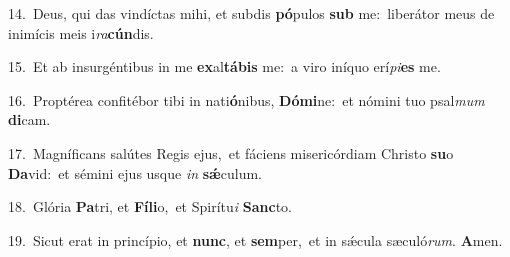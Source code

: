 {\numbfont\textcolor{\numbcolor}{14.}}~Deus, qui das vindíctas mihi, et subdis \textbf{pó}\-pulos \textbf{sub} me:~\star liberátor meus de inimícis meis i\-\textit{ra}\-\textbf{cún}dis.\par
{\numbfont\textcolor{\numbcolor}{15.}}~Et ab insurgéntibus in me \textbf{ex}\-al\-\textbf{tá}\-\textbf{bis} me:~\star a viro iníquo erí\-\textit{pi}\-\textbf{es} me.\par
{\numbfont\textcolor{\numbcolor}{16.}}~Proptérea confitébor tibi in nati\-\textbf{ó}\-nibus, \textbf{Dó}\-\textbf{mi}ne:~\star et nómini tuo psal\textit{mum} \textbf{di}\-cam.\par
{\numbfont\textcolor{\numbcolor}{17.}}~Magníficans salútes Regis ejus,~\dagger et fáciens misericórdiam Christo \textbf{su}\-o \textbf{Da}\-vid:~\star et sémini ejus usque \textit{in} \textbf{sǽ}\-culum.\par
{\numbfont\textcolor{\numbcolor}{18.}}~Glória \textbf{Pa}\-tri, et \textbf{Fí}\-\textbf{li}o,~\star et Spirítu\textit{i} \textbf{Sanc}\-to.\par
{\numbfont\textcolor{\numbcolor}{19.}}~Sicut erat in princípio, et \textbf{nunc}\-, et \textbf{sem}\-per,~\star et in sǽcula sæculó\-\textit{rum}\-. \textbf{A}\-men.\par
